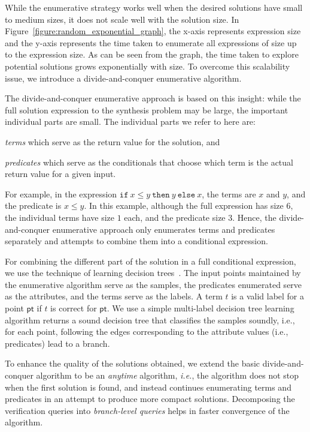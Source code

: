 \documentclass{llncs}
\newcommand\arsays[1]{{\bf AR: #1}}
\newcommand{\ie}{\emph{i.e.}}
\newcommand\Point{\mathsf{pt}}
\newcommand\Term{t}
\newcommand\ITE[3]{\mathtt{if}~#1~\mathtt{then}~#2~\mathtt{else}~#3}
\begin{document}
While the enumerative strategy works well when the desired solutions
have small to medium sizes, it does not scale well with the solution
size.  In Figure~\ref{figure:random_exponential_graph}, the x-axis
represents expression size and the y-axis represents the time taken to
enumerate all expressions of size up to the expression size.  As can
be seen from the graph, the time taken to explore potential solutions
grows exponentially with size.  To overcome this scalability issue, we
introduce a divide-and-conquer enumerative algorithm.

The divide-and-conquer enumerative approach is based on this insight:
while the full solution expression to the synthesis problem may be
large, the important individual parts are small.
The individual parts we refer to here are:
\begin{inparaenum}[(a)]
\item {\em terms} which serve as the return value for the solution,
  and
\item {\em predicates} which serve as the conditionals that choose which
  term is the actual return value for a given input.
\end{inparaenum}
For example, in the expression $\ITE{x \leq y}{y}{x}$, the terms are $x$
and $y$, and the predicate is $x \leq y$.
In this example, although the full expression has size $6$,
the individual terms have size $1$ each, and the predicate size $3$.
Hence, the divide-and-conquer enumerative approach only enumerates terms
and predicates separately and attempts to combine them into a
conditional expression.

For combining the different part of the solution in a full conditional
expression, we use the technique of learning decision
trees~\cite{quinlan-86,bishop-book}.
The input points maintained by the enumerative algorithm serve as the
samples, the predicates enumerated serve as the attributes, and the
terms serve as the labels.
A term $\Term$ is a valid label for a point $\Point$ if $\Term$ is
correct for $\Point$.
We use a simple multi-label decision tree learning algorithm returns a
sound decision tree that classifies the samples soundly, i.e., for each
point, following the edges corresponding to the attribute values (i.e.,
predicates) lead to a branch.

To enhance the quality of the solutions obtained, we extend the basic
divide-and-conquer algorithm to be an \emph{anytime}
algorithm, \ie, the algorithm does not stop when the first
solution is found, and instead continues enumerating terms and
predicates in an attempt to produce more compact
solutions. Decomposing the verification queries into
\emph{branch-level queries} helps in faster convergence of the
algorithm.
\end{document}
